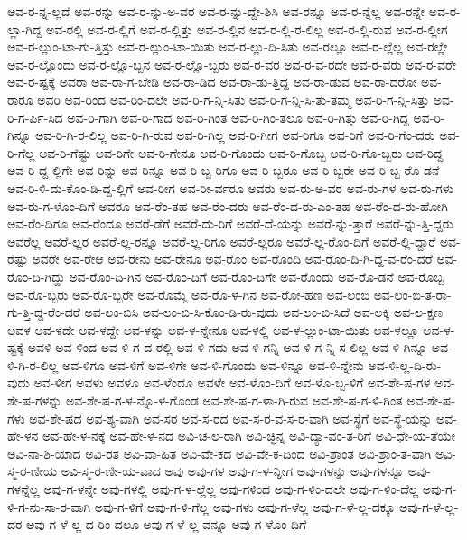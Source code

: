 {ಅವ-ರ-ನ್ನ-ಲ್ಲದೆ
ಅವ-ರನ್ನು
ಅವ-ರ-ನ್ನು-ಅ-ವರ
ಅವ-ರ-ನ್ನು-ದ್ದೇ-ಶಿಸಿ
ಅವ-ರನ್ನೂ
ಅವ-ರ-ನ್ನೆಲ್ಲ
ಅವ-ರನ್ನೇ
ಅವ-ರ-ಲ್ಲಾ-ಗಿದ್ದ
ಅವ-ರಲ್ಲಿ
ಅವ-ರ-ಲ್ಲಿಗೆ
ಅವ-ರ-ಲ್ಲಿತ್ತು
ಅವ-ರ-ಲ್ಲಿನ
ಅವ-ರ-ಲ್ಲಿ-ರ-ಲಿಲ್ಲ
ಅವ-ರ-ಲ್ಲಿ-ರುವ
ಅವ-ರ-ಲ್ಲೀಗ
ಅವ-ರ-ಲ್ಲುಂ-ಟಾ-ಗು-ತ್ತಿತ್ತು
ಅವ-ರ-ಲ್ಲುಂ-ಟಾ-ಯಿತು
ಅವ-ರ-ಲ್ಲು-ದಿ-ಸಿತು
ಅವ-ರಲ್ಲೂ
ಅವ-ರ-ಲ್ಲೆಲ್ಲ
ಅವ-ರಲ್ಲೇ
ಅವ-ರ-ಲ್ಲೊಂದು
ಅವ-ರ-ಲ್ಲೊ-ಬ್ಬನ
ಅವ-ರ-ಲ್ಲೊ-ಬ್ಬರು
ಅವ-ರ-ವರ
ಅವ-ರ-ವ-ರದೇ
ಅವ-ರ-ವರು
ಅವ-ರ-ವರೇ
ಅವ-ರ-ಷ್ಟಕ್ಕೆ
ಅವರಾ
ಅವ-ರಾ-ಗ-ಬೇಡಿ
ಅವ-ರಾ-ಡಿದ
ಅವ-ರಾ-ಡು-ತ್ತಿದ್ದ
ಅವ-ರಾ-ಡುವ
ಅವ-ರಾ-ದರೋ
ಅವ-ರಾರೂ
ಅವರಿ
ಅವ-ರಿಂದ
ಅವ-ರಿಂ-ದಲೇ
ಅವ-ರಿ-ಗ-ನ್ನಿ-ಸಿತು
ಅವ-ರಿ-ಗ-ನ್ನಿ-ಸಿ-ತು-ತಮ್ಮ
ಅವ-ರಿ-ಗ-ನ್ನಿ-ಸಿತ್ತು
ಅವ-ರಿ-ಗ-ರ್ಪಿ-ಸಿದ
ಅವ-ರಿ-ಗಾಗಿ
ಅವ-ರಿ-ಗಾದ
ಅವ-ರಿ-ಗಿಂತ
ಅವ-ರಿ-ಗಿಂ-ತಲೂ
ಅವ-ರಿ-ಗಿತ್ತು
ಅವ-ರಿ-ಗಿದ್ದ
ಅವ-ರಿ-ಗಿನ್ನೂ
ಅವ-ರಿ-ಗಿ-ರ-ಲಿಲ್ಲ
ಅವ-ರಿ-ಗಿ-ರುವ
ಅವ-ರಿ-ಗಿಲ್ಲ
ಅವ-ರಿ-ಗೀಗ
ಅವ-ರಿಗೂ
ಅವ-ರಿಗೆ
ಅವ-ರಿ-ಗೆಂ-ದರು
ಅವ-ರಿ-ಗೆಲ್ಲ
ಅವ-ರಿ-ಗೆಷ್ಟು
ಅವ-ರಿಗೇ
ಅವ-ರಿ-ಗೇನೂ
ಅವ-ರಿ-ಗೊಂದು
ಅವ-ರಿ-ಗೊಬ್ಬ
ಅವ-ರಿ-ಗೊ-ಬ್ಬರು
ಅವ-ರಿದ್ದ
ಅವ-ರಿ-ದ್ದ-ಲ್ಲಿಗೇ
ಅವ-ರಿನ್ನು
ಅವ-ರಿನ್ನೂ
ಅವ-ರಿ-ಬ್ಬ-ರಿಗೂ
ಅವ-ರಿ-ಬ್ಬರೂ
ಅವ-ರಿ-ಬ್ಬರೇ
ಅವ-ರಿ-ಬ್ಬ-ರೊ-ಡನೆ
ಅವ-ರಿ-ಳಿ-ದು-ಕೊಂ-ಡಿ-ದ್ದ-ಲ್ಲಿಗೆ
ಅವ-ರೀಗ
ಅವ-ರೀ-ರ್ವರೂ
ಅವರು
ಅವ-ರು-ಅ-ವರ
ಅವ-ರು-ಗಳ
ಅವ-ರು-ಗಳು
ಅವ-ರು-ಗ-ಳೊಂ-ದಿಗೆ
ಅವರೂ
ಅವ-ರೆಂ-ತಹ
ಅವ-ರೆಂ-ದರು
ಅವ-ರೆಂ-ದ-ರು-ಎಂ-ತಹ
ಅವ-ರೆಂ-ದ-ರು-ಹೋಗಿ
ಅವ-ರೆಂ-ದಿಗೂ
ಅವ-ರೆಂದೂ
ಅವರೆ-ಡೆಗೆ
ಅವರೆ-ದು-ರಿಗೆ
ಅವರೆ-ದೆ-ಯನ್ನು
ಅವರೆ-ನ್ನು-ತ್ತಾರೆ
ಅವರೆ-ನ್ನು-ತ್ತಿ-ದ್ದರು
ಅವರೆಲ್ಲ
ಅವರೆ-ಲ್ಲರ
ಅವರೆ-ಲ್ಲ-ರನ್ನೂ
ಅವರೆ-ಲ್ಲ-ರಿಗೂ
ಅವರೆ-ಲ್ಲರೂ
ಅವರೆ-ಲ್ಲ-ರೊಂ-ದಿಗೆ
ಅವರೆ-ಲ್ಲಿ-ದ್ದಾರೆ
ಅವ-ರೆಷ್ಟು
ಅವರೇ
ಅವ-ರೇಆ
ಅವ-ರೇನು
ಅವ-ರೇನೂ
ಅವ-ರೊಂ
ಅವ-ರೊಂದಿ
ಅವ-ರೊಂ-ದಿ-ಗಿ-ದ್ದ-ವ-ರೆಂ-ದರೆ
ಅವ-ರೊಂ-ದಿ-ಗಿದ್ದು
ಅವ-ರೊಂ-ದಿ-ಗಿನ
ಅವ-ರೊಂ-ದಿಗೆ
ಅವ-ರೊಂ-ದಿಗೇ
ಅವ-ರೊಂದು
ಅವ-ರೊ-ಡನೆ
ಅವ-ರೊಬ್ಬ
ಅವ-ರೊ-ಬ್ಬರು
ಅವ-ರೊ-ಬ್ಬರೇ
ಅವ-ರೊಮ್ಮೆ
ಅವ-ರೊ-ಳ-ಗಿನ
ಅವ-ರೋ-ಹಣ
ಅವ-ಲಂಬಿ
ಅವ-ಲಂ-ಬಿ-ತ-ರಾ-ಗು-ತ್ತಿ-ದ್ದ-ರೆಂ-ದರೆ
ಅವ-ಲಂ-ಬಿಸಿ
ಅವ-ಲಂ-ಬಿ-ಸಿ-ಕೊಂ-ಡಿ-ರು-ವುದು
ಅವ-ಲಂ-ಬಿ-ಸಿದೆ
ಅವ-ಲಕ್ಕಿ
ಅವ-ಲ-ಕ್ಷಣ
ಅವಳ
ಅವ-ಳದೇ
ಅವ-ಳದ್ದೇ
ಅವ-ಳನ್ನು
ಅವ-ಳ-ನ್ನೇನೂ
ಅವ-ಳಲ್ಲಿ
ಅವ-ಳ-ಲ್ಲುಂ-ಟಾ-ಯಿತು
ಅವ-ಳಲ್ಲೂ
ಅವ-ಳ-ಷ್ಟಕ್ಕೆ
ಅವಳಿ
ಅವ-ಳಿಂದ
ಅವ-ಳಿ-ಗ-ದ-ರಲ್ಲಿ
ಅವ-ಳಿ-ಗದು
ಅವ-ಳಿ-ಗನ್ನಿ
ಅವ-ಳಿ-ಗ-ನ್ನಿ-ಸ-ಲಿಲ್ಲ
ಅವ-ಳಿ-ಗಿನ್ನೂ
ಅವ-ಳಿ-ಗಿ-ರ-ಲಿಲ್ಲ
ಅವ-ಳಿಗೂ
ಅವ-ಳಿಗೆ
ಅವ-ಳಿಗೇ
ಅವ-ಳಿ-ಗೊಂದು
ಅವ-ಳಿನ್ನೂ
ಅವ-ಳಿ-ನ್ನೇನು
ಅವ-ಳಿ-ಲ್ಲ-ದಿ-ರು-ವುದು
ಅವ-ಳೀಗ
ಅವಳು
ಅವಳೂ
ಅವ-ಳೆಂದೂ
ಅವಳೇ
ಅವ-ಳೊಂ-ದಿಗೆ
ಅವ-ಳೊ-ಬ್ಬ-ಳಿಗೆ
ಅವ-ಶೇ-ಷ-ಗಳ
ಅವ-ಶೇ-ಷ-ಗಳನ್ನು
ಅವ-ಶೇ-ಷ-ಗ-ಳ-ನ್ನೊ-ಳ-ಗೊಂಡ
ಅವ-ಶೇ-ಷ-ಗ-ಳಾ-ಗಿ-ರುವ
ಅವ-ಶೇ-ಷ-ಗ-ಳಿ-ಗಿಂತ
ಅವ-ಶೇ-ಷ-ಗಳು
ಅವ-ಶೇ-ಷದ
ಅವ-ಶ್ಯ-ವಾಗಿ
ಅವ-ಸರ
ಅವ-ಸ-ರದ
ಅವ-ಸ-ರ-ವ-ಸ-ರ-ವಾಗಿ
ಅವ-ಸ್ಥೆಗೆ
ಅವ-ಸ್ಥೆ-ಯನ್ನು
ಅವ-ಹೇ-ಳನ
ಅವ-ಹೇ-ಳ-ನಕ್ಕೆ
ಅವ-ಹೇ-ಳ-ನದ
ಅವಿ-ಚ-ಲ-ರಾಗಿ
ಅವಿ-ಚ್ಛಿನ್ನ
ಅವಿ-ದ್ಯಾ-ವಂ-ತ-ರಿಗೆ
ಅವಿ-ಧೇ-ಯ-ತೆಯೇ
ಅವಿ-ನಾ-ಶಿ-ಯಾದ
ಅವಿ-ರತ
ಅವಿ-ವಾ-ಹಿತ
ಅವಿ-ವೇ-ಕದ
ಅವಿ-ವೇ-ಕ-ದಿಂದ
ಅವಿ-ಶ್ರಾಂತ
ಅವಿ-ಶ್ರಾಂ-ತ-ವಾಗಿ
ಅವಿ-ಸ್ಮ-ರ-ಣೀಯ
ಅವಿ-ಸ್ಮ-ರ-ಣೀ-ಯ-ವಾದ
ಅವು
ಅವು-ಗಳ
ಅವು-ಗ-ಳ-ನ್ನೀಗ
ಅವು-ಗಳನ್ನು
ಅವು-ಗಳನ್ನೂ
ಅವು-ಗಳನ್ನೆಲ್ಲ
ಅವು-ಗ-ಳನ್ನೇ
ಅವು-ಗಳಲ್ಲಿ
ಅವು-ಗ-ಳ-ಲ್ಲೆಲ್ಲ
ಅವು-ಗಳಿಂದ
ಅವು-ಗ-ಳಿಂ-ದಲೇ
ಅವು-ಗ-ಳಿಂ-ದೆಲ್ಲ
ಅವು-ಗ-ಳಿ-ಗ-ನು-ಸಾ-ರ-ವಾಗಿ
ಅವು-ಗ-ಳಿಗೆ
ಅವು-ಗ-ಳಿ-ಗೆಲ್ಲ
ಅವು-ಗಳು
ಅವು-ಗ-ಳೆಲ್ಲ
ಅವು-ಗ-ಳೆ-ಲ್ಲ-ದಕ್ಕೂ
ಅವು-ಗ-ಳೆ-ಲ್ಲ-ದರ
ಅವು-ಗ-ಳೆ-ಲ್ಲ-ದ-ರಿಂ-ದಲೂ
ಅವು-ಗ-ಳೆ-ಲ್ಲ-ವನ್ನೂ
ಅವು-ಗ-ಳೊಂ-ದಿಗೆ
}
